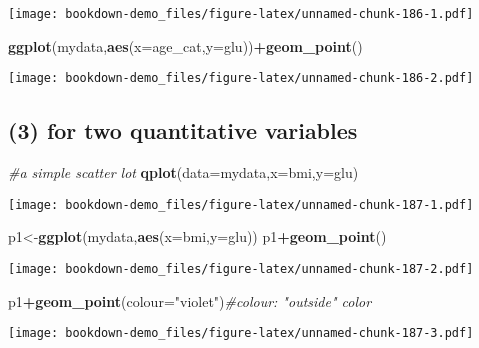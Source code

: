 \documentclass[]{book}
\newenvironment{Shaded}{\begin{snugshade}}{\end{snugshade}}
\newcommand{\KeywordTok}[1]{\textcolor[rgb]{0.13,0.29,0.53}{\textbf{#1}}}
\newcommand{\DataTypeTok}[1]{\textcolor[rgb]{0.13,0.29,0.53}{#1}}
\newcommand{\StringTok}[1]{\textcolor[rgb]{0.31,0.60,0.02}{#1}}
\newcommand{\CommentTok}[1]{\textcolor[rgb]{0.56,0.35,0.01}{\textit{#1}}}
\newcommand{\OperatorTok}[1]{\textcolor[rgb]{0.81,0.36,0.00}{\textbf{#1}}}
\newcommand{\NormalTok}[1]{#1}
\theoremstyle{definition}
\theoremstyle{definition}
\theoremstyle{definition}
\theoremstyle{remark}
\begin{document}
\texttt{[image: bookdown-demo\_files/figure-latex/unnamed-chunk-186-1.pdf]}

\begin{Shaded}
\begin{Highlighting}[]
\KeywordTok{ggplot}\NormalTok{(mydata,}\KeywordTok{aes}\NormalTok{(}\DataTypeTok{x=}\NormalTok{age_cat,}\DataTypeTok{y=}\NormalTok{glu))}\OperatorTok{+}\KeywordTok{geom_point}\NormalTok{()}
\end{Highlighting}
\end{Shaded}

\texttt{[image: bookdown-demo\_files/figure-latex/unnamed-chunk-186-2.pdf]}

\subsection{(3) for two quantitative
variables}\label{for-two-quantitative-variables-1}

\begin{Shaded}
\begin{Highlighting}[]
\CommentTok{#a simple scatter lot}
\KeywordTok{qplot}\NormalTok{(}\DataTypeTok{data=}\NormalTok{mydata,}\DataTypeTok{x=}\NormalTok{bmi,}\DataTypeTok{y=}\NormalTok{glu)}
\end{Highlighting}
\end{Shaded}

\texttt{[image: bookdown-demo\_files/figure-latex/unnamed-chunk-187-1.pdf]}

\begin{Shaded}
\begin{Highlighting}[]
\NormalTok{p1<-}\KeywordTok{ggplot}\NormalTok{(mydata,}\KeywordTok{aes}\NormalTok{(}\DataTypeTok{x=}\NormalTok{bmi,}\DataTypeTok{y=}\NormalTok{glu))}
\NormalTok{p1}\OperatorTok{+}\KeywordTok{geom_point}\NormalTok{()}
\end{Highlighting}
\end{Shaded}

\texttt{[image: bookdown-demo\_files/figure-latex/unnamed-chunk-187-2.pdf]}

\begin{Shaded}
\begin{Highlighting}[]
\NormalTok{p1}\OperatorTok{+}\KeywordTok{geom_point}\NormalTok{(}\DataTypeTok{colour=}\StringTok{"violet"}\NormalTok{)}\CommentTok{#colour: "outside" color}
\end{Highlighting}
\end{Shaded}

\texttt{[image: bookdown-demo\_files/figure-latex/unnamed-chunk-187-3.pdf]}
\end{document}
